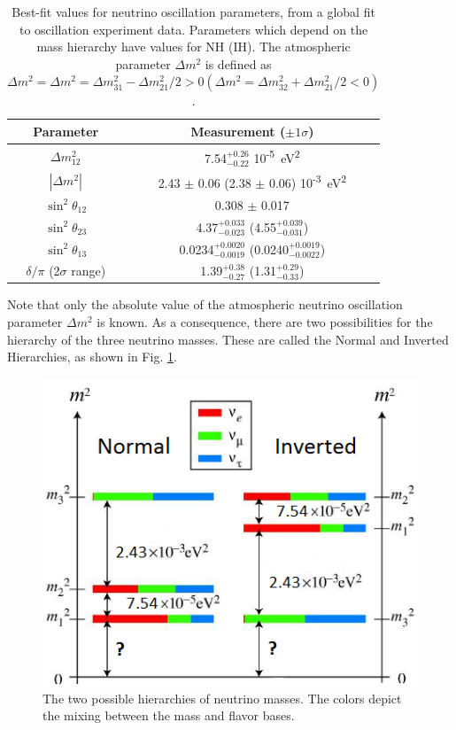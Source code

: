\begin{table}[!htbp]
\caption{Best-fit values for neutrino oscillation parameters, from a global fit to oscillation experiment data.   Parameters which depend on the mass hierarchy have values for NH (IH).  The atmospheric parameter $\Delta m^{2}$ is defined as $\Delta m^{2} = \Delta m^{2} = \Delta m_{31}^{2} - \Delta m_{21}^{2}/2 > 0 (\Delta m^{2} = \Delta m_{32}^{2} + \Delta m_{21}^{2}/2 < 0)$. \cite{ReviewNuMass}} %
\label{table:nu_osc_vals}
\begin{tabular}{c|c}
Parameter & Measurement ($\pm 1 \sigma$) \\
\hline
$\Delta m_{12}^{2}$ & 7.54$^{+0.26}_{-0.22}$ 10\textsuperscript{-5}~eV\textsuperscript{2}\\
$|\Delta m^{2}|$ & 2.43 $\pm$ 0.06 (2.38 $\pm$ 0.06) 10\textsuperscript{-3}~eV\textsuperscript{2}\\
$\sin^{2} \theta_{12}$ & 0.308 $\pm$ 0.017\\
$\sin^{2} \theta_{23}$ & 4.37$^{+0.033}_{-0.023}$ (4.55$^{+0.039}_{-0.031}$)\\
$\sin^{2} \theta_{13}$ & 0.0234$^{+0.0020}_{-0.0019}$ (0.0240$^{+0.0019}_{-0.0022}$)\\
$\delta / \pi$ (2$\sigma$ range)& 1.39$^{+0.38}_{-0.27}$ (1.31$^{+0.29}_{-0.33}$)\\
\end{tabular}
\end{table}

Note that only the absolute value of the atmospheric neutrino oscillation parameter $\Delta m^{2}$ is known.  As a consequence, there are two possibilities for the hierarchy of the three neutrino masses.  These are called the Normal and Inverted Hierarchies, as shown in Fig. \ref{fig:numasshier}.

\begin{figure}[H]
        \centering
                \includegraphics[width=.5\textwidth]{figures/hierarchy_alterred.png}
                \caption{The two possible hierarchies of neutrino masses.  The colors depict the mixing between the mass and flavor bases.}
\label{fig:numasshier}
\end{figure}

